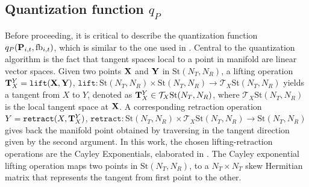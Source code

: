 \documentclass[conference]{IEEEtran}
\begin{document}
\subsection{Quantization function $q_P$}
Before proceeding, it is critical to describe the quantization function $q_P({\bf P}_{i,t},\text{fb}_{i,t})$, which is similar to the one used in \cite{6891198,Gupt1905:Predictive,6545375}.
Central to the quantization algorithm is the fact that tangent spaces local to a point in manifold are linear vector spaces.
Given two points ${\bf X}$ and ${\bf Y}$ in $\text{St}(N_T,N_R)$, a lifting operation ${\bf T}^Y_X=\texttt{lift}({\bf X},{\bf Y})$, $\texttt{lift}:\text{St}(N_T,N_R)\times \text{St}(N_T,N_R) \to \mathcal{T}_X \text{St}(N_T,N_R)$ yields a tangent from $X$ to $Y$, denoted as ${\bf T}^Y_X \in \mathcal{T}_X \text{St}(N_T,N_R)$, where $\mathcal{T}_X \text{St}(N_T,N_R)$ is the local tangent space at ${\bf X}$.
A corresponding retraction operation $Y=\texttt{retract}(X,{\bf T}^Y_X)$, $\texttt{retract}: \text{St}(N_T,N_R)\times \mathcal{T}_X \text{St}(N_T,N_R) \to \text{St}(N_T,N_R)$ gives back the manifold point obtained by traversing in the tangent direction given by the second argument.
In this work, the chosen lifting-retraction operations are the Cayley Exponentials, elaborated in \cite{DBLP:journals/corr/abs-1708-00045}. %
The Cayley exponential lifting operation maps two points in $\text{St}(N_T,N_R)$, to a $N_T\times N_T$ skew Hermitian matrix that represents the tangent from first point to the other.
\end{document}
